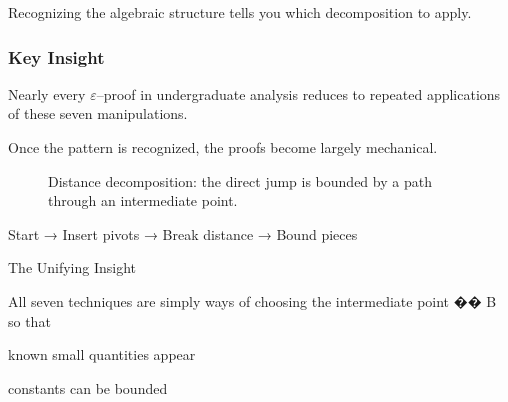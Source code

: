 Recognizing the algebraic structure tells you which decomposition to apply.

\bigskip

\subsubsection*{Key Insight}

Nearly every $\varepsilon$--proof in undergraduate analysis reduces to
repeated applications of these seven manipulations.

Once the pattern is recognized, the proofs become largely mechanical.

\begin{figure}[h]
\centering
{}

\caption{Distance decomposition: the direct jump is bounded by a path
through an intermediate point.}
\end{figure}

Start → Insert pivots → Break distance → Bound pieces


The Unifying Insight

All seven techniques are simply ways of choosing the intermediate point 
��
B so that

known small quantities appear

constants can be bounded

